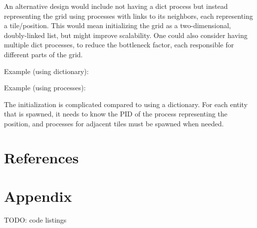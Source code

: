\documentclass[12pt]{article}
\begin{document}
An alternative design would include not having a dict process but instead representing the grid using processes with links to its neighbors, each representing a tile/position. 
This would mean initializing the grid as a two-dimensional, doubly-linked list, but might improve scalability. 
One could also consider having multiple dict processes, to reduce the bottleneck factor, each responsible for different parts of the grid.

Example (using dictionary):

Example (using processes):

The initialization is complicated compared to using a dictionary. For each entity that is spawned, it needs to know the PID of the process representing the position, and processes for adjacent tiles must be spawned when needed.

\section{References}

\section{Appendix}

TODO: code listings
\end{document}
